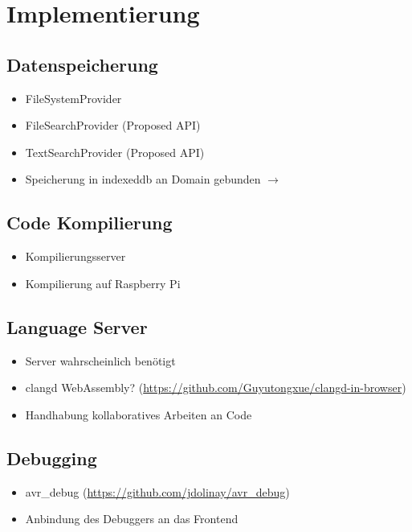 \chapter{Implementierung} \label{implementierung}

\section{Datenspeicherung}

\begin{itemize}
    \item FileSystemProvider
    \item FileSearchProvider (Proposed API)
    \item TextSearchProvider (Proposed API)
    \item Speicherung in indexeddb an Domain gebunden $\to$
\end{itemize}

\section{Code Kompilierung}

\begin{itemize}
    \item Kompilierungsserver
    \item Kompilierung auf Raspberry Pi
\end{itemize}

\section{Language Server}

\begin{itemize}
    \item Server wahrscheinlich benötigt
    \item clangd WebAssembly? (\href{https://github.com/Guyutongxue/clangd-in-browser}{https://github.com/Guyutongxue/clangd-in-browser})
    \item Handhabung kollaboratives Arbeiten an Code
\end{itemize}

\section{Debugging}

\begin{itemize}
    \item avr\_debug (\href{https://github.com/jdolinay/avr_debug}{https://github.com/jdolinay/avr\_debug})
    \item Anbindung des Debuggers an das Frontend
\end{itemize}

